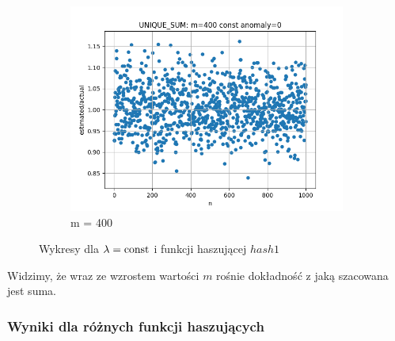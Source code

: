 \documentclass{article}
\begin{document}
\begin{figure}[H]
            \begin{subfigure}{0.6\textwidth}
                \centering
                \includegraphics[width=\linewidth]{sum/zad1_m=400.png}
                \caption{m = 400}
            \end{subfigure}
            \begin{subfigure}{0.6\textwidth}
            \end{subfigure}
            \caption{Wykresy dla $\lambda = \textnormal{const}$ i funkcji haszującej $hash1$}
        \end{figure}
    
        Widzimy, że wraz ze wzrostem wartości $m$ rośnie dokładność z jaką szacowana jest suma.

    \subsubsection{Wyniki dla różnych funkcji haszujących}
\end{document}
